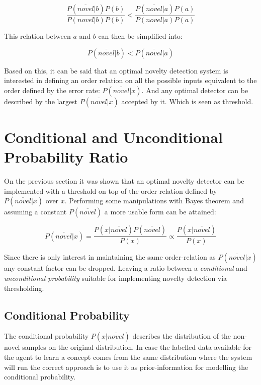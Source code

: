 \begin{equation}
\label{eq:knapsack}
\frac{P(\overline{novel}|b)P(b)}{P(novel|b)P(b)} < \frac{P(\overline{novel}|a)P(a)}{P(novel|a)P(a)}
\end{equation}

This relation between $a$ and $b$ can then be simplified into:

\begin{equation}
P(\overline{novel}|b) < P(\overline{novel}|a)
\end{equation}


Based on this, it can be said that an optimal novelty detection system is
interested in defining an order relation on all the possible inputs equivalent
to the order defined by the error rate: $P(\overline{novel}|x)$.
And any optimal detector can be described by the largest $P(\overline{novel}|x)$
accepted by it. Which is seen as threshold.


\section{Conditional and Unconditional Probability Ratio}

On the previous section it was shown that an optimal novelty detector can be
implemented with a threshold on top of the order-relation defined by
$P(\overline{novel}|x)$ over $x$. Performing some manipulations with
Bayes theorem and assuming a constant $P(\overline{novel})$ a more usable
form can be attained:

\begin{equation}
\label{eq:novelty-ratio}
          P(\overline{novel}|x)
  =       \frac{P(x|\overline{novel}) P(\overline{novel})}{P(x)}
  \propto \frac{P(x|\overline{novel})}{P(x)}
\end{equation}

Since there is only interest in maintaining the same order-relation as
$P(\overline{novel}|x)$ any constant factor can be dropped.
Leaving a ratio between a \emph{conditional} and
\emph{unconditional probability} suitable for implementing novelty detection
via thresholding.


\subsection{Conditional Probability}
The conditional probability $P(x|\overline{novel})$ describes the distribution
of the non-novel samples on the original distribution. In case the labelled data
available for the agent to learn a concept comes from the same distribution
where the system will run the correct approach is to use it as prior-information
for modelling the conditional probability.

